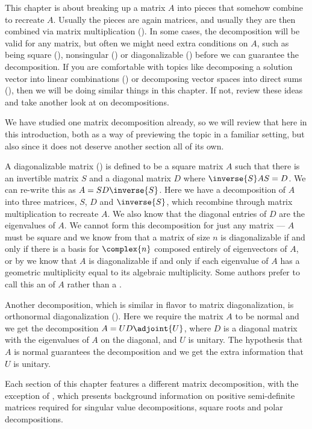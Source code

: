 This chapter is about breaking up a matrix $A$ into pieces that somehow combine to recreate $A$.  Usually the pieces are again matrices, and usually they are then combined via matrix multiplication ().  In some cases, the decomposition will be valid for any matrix, but often we might need extra conditions on $A$, such as being square (), nonsingular () or diagonalizable () before we can guarantee the decomposition.  If you are comfortable with topics like decomposing a solution vector into linear combinations () or decomposing vector spaces into direct sums (), then we will be doing similar things in this chapter.  If not, review these ideas and take another look at  on decompositions.\par
%
We have studied one matrix decomposition already, so we will review that here in this introduction, both as a way of previewing the topic in a familiar setting, but also since it does not deserve another section all of its own.\par
%
A diagonalizable matrix () is defined to be a square matrix $A$ such that there is an invertible matrix $S$ and a diagonal matrix $D$ where $\inverse{S}AS=D$.  We can re-write this as $A=SD\inverse{S}$.   Here we have a decomposition of $A$ into three matrices, $S$, $D$ and $\inverse{S}$, which recombine through matrix multiplication to recreate $A$.  We also know that the diagonal entries of $D$ are the eigenvalues of $A$.  We cannot form this decomposition for just any matrix --- $A$ must be square and we know from  that a matrix of size $n$ is diagonalizable if and only if there is a basis for $\complex{n}$ composed entirely of eigenvectors of $A$, or by  we know that $A$ is diagonalizable if and only if each eigenvalue of $A$ has a geometric multiplicity equal to its algebraic multiplicity.  Some authors prefer to call this an  of $A$ rather than a .\par
%
Another decomposition, which is similar in flavor to matrix diagonalization, is orthonormal diagonalization ().  Here we require the matrix $A$ to be normal and we get the decomposition $A=UD\adjoint{U}$, where $D$ is a diagonal matrix with the eigenvalues of $A$ on the diagonal, and $U$ is unitary.  The hypothesis that $A$ is normal guarantees the decomposition and we get the extra information that $U$ is unitary.\par
%
Each section of this chapter features a different matrix decomposition, with the exception of , which presents background information on positive semi-definite matrices required for singular value decompositions, square roots and polar decompositions.